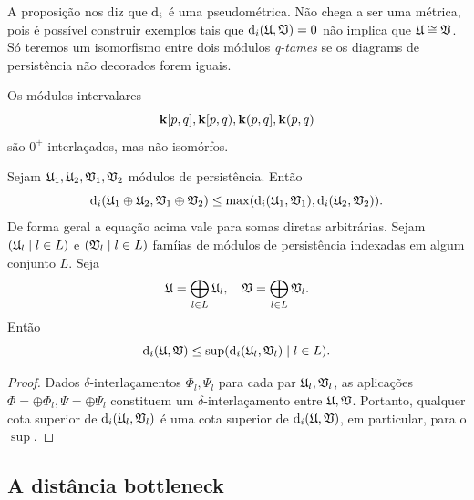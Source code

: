 A proposição nos diz que $\text{d}_i$ é uma pseudométrica. Não chega a ser uma métrica, 
pois é possível construir exemplos tais que $\text{d}_i(\mathfrak{U}, \mathfrak{V}) = 0$ não implica
que $\mathfrak{U} \cong \mathfrak{V}$. Só teremos um isomorfismo entre dois módulos \textit{q-tames}
se os diagrams de persistência não decorados forem iguais. 

\begin{ex}
    Os módulos intervalares
    \begin{equation*}
        \mathbf{k}[p,q], \mathbf{k}[p,q), \mathbf{k}(p,q], \mathbf{k}(p,q)
    \end{equation*}
    são $0^+$-interlaçados, mas não isomórfos. 
\end{ex}

\begin{propo}\label{teo:direct_sum_dist}
    Sejam $\mathfrak{U}_1, \mathfrak{U}_2, \mathfrak{V}_1, \mathfrak{V}_2$ módulos de persistência. Então
    \begin{equation*}
        \text{d}_i(\mathfrak{U}_1 \oplus \mathfrak{U}_2, \mathfrak{V}_1 \oplus \mathfrak{V}_2) \leq \max(\text{d}_i(\mathfrak{U}_1,
        \mathfrak{V}_1), \text{d}_i(\mathfrak{U}_2, \mathfrak{V}_2)).
    \end{equation*}
    De forma geral a equação acima vale para somas diretas arbitrárias. Sejam $(\mathfrak{U}_l \mid l \in L)$ 
    e $(\mathfrak{V}_l \mid l \in L)$ famíias de módulos de persistência indexadas em algum conjunto $L$. Seja
    \begin{equation*}
        \mathfrak{U} = \bigoplus_{l \in L} \mathfrak{U}_l, \quad \mathfrak{V} = \bigoplus_{l \in L} \mathfrak{V}_l.
    \end{equation*}
    Então
    \begin{equation*}
        \text{d}_i(\mathfrak{U}, \mathfrak{V}) \leq \sup(\text{d}_i(\mathfrak{U}_l, \mathfrak{V}_l) \mid l \in L).
    \end{equation*}
\end{propo}
\begin{proof}
    Dados $\delta$-interlaçamentos $\Phi_l, \Psi_l$ para cada par $\mathfrak{U}_l, \mathfrak{V}_l$, as aplicações
    $\Phi = \oplus\Phi_l, \Psi = \oplus \Psi_l$ constituem um $\delta$-interlaçamento entre 
    $\mathfrak{U}, \mathfrak{V}$. Portanto, qualquer cota superior de $\text{d}_i(\mathfrak{U}_l, \mathfrak{V}_l)$ é uma cota superior
    de $\text{d}_i(\mathfrak{U}, \mathfrak{V})$, em particular, para o $\sup$. 
\end{proof}

\subsection{A distância bottleneck}

